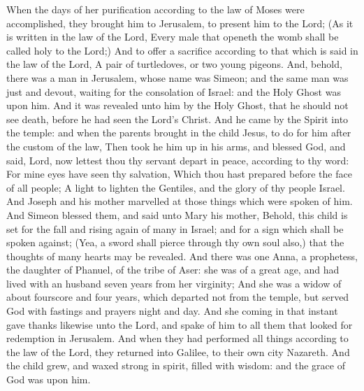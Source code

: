 
\tractnotice


 When the days of her purification according to the law of Moses were accomplished, they brought him to Jerusalem, to present him to the Lord; (As it is written in the law of the Lord, Every male that openeth the womb shall be called holy to the Lord;) And to offer a sacrifice according to that which is said in the law of the Lord, A pair of turtledoves, or two young pigeons. And, behold, there was a man in Jerusalem, whose name was Simeon; and the same man was just and devout, waiting for the consolation of Israel: and the Holy Ghost was upon him. And it was revealed unto him by the Holy Ghost, that he should not see death, before he had seen the Lord's Christ. And he came by the Spirit into the temple: and when the parents brought in the child Jesus, to do for him after the custom of the law, Then took he him up in his arms, and blessed God, and said, Lord, now lettest thou thy servant depart in peace, according to thy word: For mine eyes have seen thy salvation, Which thou hast prepared before the face of all people; A light to lighten the Gentiles, and the glory of thy people Israel. And Joseph and his mother marvelled at those things which were spoken of him. And Simeon blessed them, and said unto Mary his mother, Behold, this child is set for the fall and rising again of many in Israel; and for a sign which shall be spoken against; (Yea, a sword shall pierce through thy own soul also,) that the thoughts of many hearts may be revealed. And there was one Anna, a prophetess, the daughter of Phanuel, of the tribe of Aser: she was of a great age, and had lived with an husband seven years from her virginity; And she was a widow of about fourscore and four years, which departed not from the temple, but served God with fastings and prayers night and day. And she coming in that instant gave thanks likewise unto the Lord, and spake of him to all them that looked for redemption in Jerusalem. And when they had performed all things according to the law of the Lord, they returned into Galilee, to their own city Nazareth. And the child grew, and waxed strong in spirit, filled with wisdom: and the grace of God was upon him.

